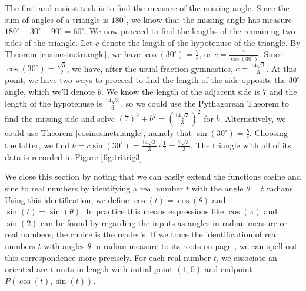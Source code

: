 {The first and easiest task is to find the measure of the missing angle.  Since the sum of angles of a triangle is $180^{\circ}$, we know that the missing angle has measure $180^{\circ} - 30^{\circ} - 90^{\circ} = 60^{\circ}$.  We now proceed to find the lengths of the remaining two sides of the triangle.  Let $c$ denote the length of the hypotenuse of the triangle.  By Theorem \ref{cosinesinetriangle}, we have $\cos\left(30^{\circ}\right) = \frac{7}{c}$, or $c = \frac{7}{\cos\left(30^{\circ}\right)}$.  Since $\cos\left(30^{\circ}\right) = \frac{\sqrt{3}}{2}$, we have, after the usual fraction gymnastics, $c = \frac{14 \sqrt{3}}{3}$.  At this point, we have two ways to proceed to find the length of the side opposite the $30^{\circ}$ angle, which we'll denote $b$.  We know the length of the adjacent side is $7$ and the length of the hypotenuse is $\frac{14 \sqrt{3}}{3}$, so we could use the Pythagorean Theorem to find the missing side and solve  $(7)^2 + b^2 = \left( \frac{14 \sqrt{3}}{3} \right)^{2}$ for $b$.  Alternatively, we could use Theorem \ref{cosinesinetriangle}, namely that $\sin\left(30^{\circ}\right) = \frac{b}{c}$.  Choosing the latter, we find $b = c \sin\left(30^{\circ}\right) = \frac{14 \sqrt{3}}{3} \cdot \frac{1}{2} = \frac{7 \sqrt{3}}{3}$.  The triangle with all of its data is recorded in Figure \ref{fig:tritrig3}


}

\medskip

We close this section by noting that we can easily extend the functions cosine and sine to real numbers by identifying a real number $t$ with the angle $\theta = t$ radians.  Using this identification, we define $\cos(t) = \cos(\theta)$ and $\sin(t) = \sin(\theta)$. In practice this means expressions like $\cos(\pi)$ and $\sin(2)$ can be found by regarding the inputs as angles in radian measure or real numbers;  the choice is the reader's.  If we trace the identification of real numbers $t$ with angles $\theta$ in radian measure to its roots on page \pageref{wrappingfunction}, we can spell out this correspondence more precisely.  For each real number $t$, we associate an oriented arc $t$ units in length with initial point $(1,0)$ and endpoint $P(\cos(t), \sin(t))$.


